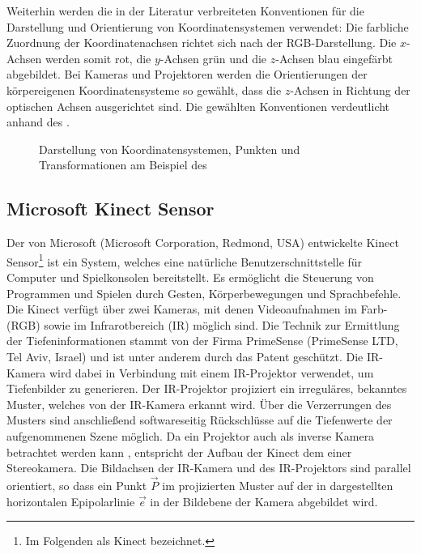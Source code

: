 Weiterhin werden die in der Literatur verbreiteten Konventionen für die Darstellung und Orientierung von Koordinatensystemen verwendet: Die farbliche Zuordnung der Koordinatenachsen richtet sich nach der RGB-Darstellung. Die $x$-Achsen werden somit rot, die $y$-Achsen grün und die $z$-Achsen blau eingefärbt abgebildet. Bei Kameras und Projektoren werden die Orientierungen der körpereigenen Koordinatensysteme so gewählt, dass die $z$-Achsen in Richtung der optischen Achsen ausgerichtet sind. Die gewählten Konventionen verdeutlicht  anhand des .

\begin{figure}[ht]
	\begin{center}%
		\caption{Darstellung von Koordinatensystemen, Punkten und Transformationen am Beispiel des }
		\label{fig.coords}
	\end{center}
\end{figure}


\subsection{Microsoft Kinect\textsuperscript{\texttrademark} Sensor}
\label{chap.kinect}
Der von Microsoft (Microsoft Corporation, Redmond, USA) entwickelte Kinect\textsuperscript{\texttrademark} Sensor\footnote{Im Folgenden als Kinect bezeichnet.} ist ein System, welches eine natürliche Benutzerschnittstelle für Computer und Spielkonsolen bereitstellt. Es ermöglicht die Steuerung von Programmen und Spielen durch Gesten, Körperbewegungen und Sprachbefehle. Die Kinect verfügt über zwei Kameras, mit denen Videoaufnahmen im Farb- (RGB) sowie im Infrarotbereich (IR) möglich sind. Die Technik zur Ermittlung der Tiefeninformationen stammt von der Firma PrimeSense (PrimeSense LTD, Tel Aviv, Israel) und ist unter anderem durch das Patent \cite{Freedman2008} geschützt. Die IR-Kamera wird dabei in Verbindung mit einem IR-Projektor verwendet, um Tiefenbilder zu generieren. Der IR-Projektor projiziert ein irreguläres, bekanntes Muster, welches von der IR-Kamera erkannt wird. Über die Verzerrungen des Musters sind anschließend softwareseitig Rückschlüsse auf die Tiefenwerte der aufgenommenen Szene möglich. Da ein Projektor auch als inverse Kamera betrachtet werden kann \cite{Kimura2007}, entspricht der Aufbau der Kinect dem einer Stereokamera. Die Bildachsen der IR-Kamera und des IR-Projektors sind parallel orientiert, so dass ein Punkt $\vec{P}$ im projizierten Muster auf der in  dargestellten horizontalen Epipolarlinie $\vec{e}$ in der Bildebene der Kamera abgebildet wird.\\

